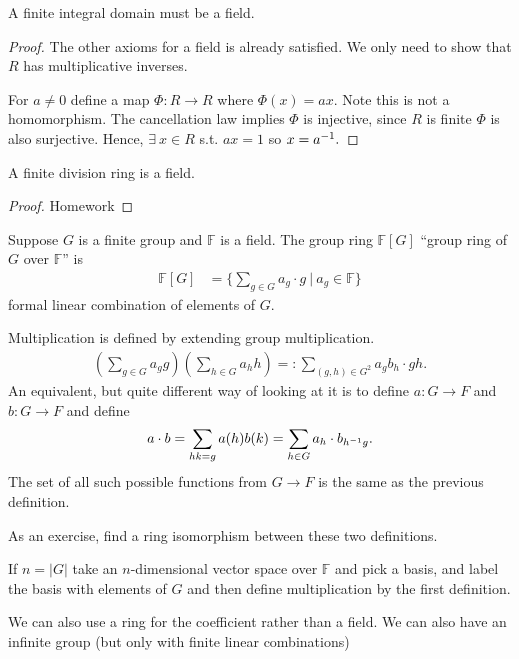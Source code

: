 \documentclass[a4paper]{article}
\begin{document}
\begin{theorem}
    A finite integral domain must be a field.
    \begin{proof}
        The other axioms for a field is already satisfied. We only need to show that $R$ has multiplicative inverses.

        For $a\neq0$ define a map $\Phi:R\to R$ where $\Phi(x)=ax.$ Note this is not a homomorphism. The cancellation law implies $\Phi$ is injective, since $R$ is finite $\Phi$ is also surjective. Hence, $\exists~x\in R$ s.t. $ax=1$ so $x=a^{-1}.$
    \end{proof}
\end{theorem}
\begin{theorem}[Wedderburn]
    A finite division ring is a field.
    \begin{proof}
        Homework
    \end{proof}
\end{theorem}
\begin{definition}
    Suppose $G$ is a finite group and $\mathbb F$ is a field. The group ring $\mathbb F[G]$ ``group ring of $G$ over $\mathbb F$'' is \begin{align}
        \mathbb F[G]&=\{\sum_{g\in G}a_g\cdot g~|~a_g\in\mathbb F\}
    \end{align}
    formal linear combination of elements of $G.$

    Multiplication is defined by extending group multiplication. \begin{align}
        \left(\sum_{g\in G}a_gg\right)\left(\sum_{h\in G}a_hh\right)=:\sum_{(g,h)\in G^2}a_gb_h\cdot gh.
    \end{align}
    An equivalent, but quite different way of looking at it is to define $a:G\to F$ and $b:G\to F$ and define \begin{align}
        a\cdot b=\sum_{hk=g}a(h)b(k)=\sum_{h\in G}a_h\cdot b_{h^{-1} g}.
    \end{align}
    The set of all such possible functions from $G\to F$ is the same as the previous definition.

    As an exercise, find a ring isomorphism between these two definitions.
\end{definition}
If $n=|G|$ take an $n$-dimensional vector space over $\mathbb F$ and pick a basis, and label the basis with elements of $G$ and then define multiplication by the first definition.

We can also use a ring for the coefficient rather than a field. We can also have an infinite group (but only with finite linear combinations)
\end{document}
